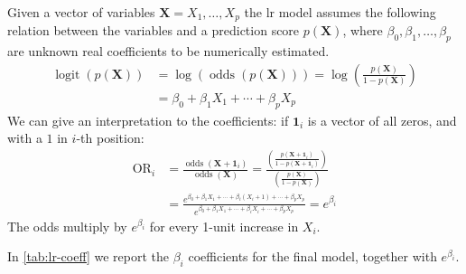 Given a vector of variables $\bm{X} = X_1, \dots, X_p$ the \gls{lr} model assumes the following relation between the variables and a prediction score $p(\bm{X})$, where $\beta_0, \beta_1, \dots, \beta_p$ are unknown real coefficients to be numerically estimated.
\begin{align*}
    \operatorname{logit}(p(\bm{X})) &= \log (\operatorname{odds}(p(\bm{X}))) = \log \left( \frac{p(\bm{X})}{1-p(\bm{X})} \right)\\
    & = \beta_0 + \beta_1 X_1 + \cdots + \beta_p X_p
\end{align*}
We can give an interpretation to the coefficients: if $\bm{1}_i$ is a vector of all zeros, and with a $1$ in $i$-th position:
\begin{align*}
\operatorname{OR}_i &= \frac{\operatorname{odds}(\bm{X}+\bm{1}_i)}{\operatorname{odds}(\bm{X})} = \frac{\left(\frac{p(\bm{X}+\bm{1}_i)}{1 - p(\bm{X}+\bm{1}_i)}\right)}{\left(\frac{p(\bm{X})}{1 - p(\bm{X})}\right)}\\
&= \frac{e^{\beta_0 + \beta_1 X_1 + \cdots + \beta_i (X_i + 1) + \cdots + \beta_p X_p}}{e^{\beta_0 + \beta_1 X_1 + \cdots + \beta_i X_i + \cdots + \beta_p X_p}} = e^{\beta_i}
\end{align*}
The odds multiply by $e^{\beta_i}$ for every 1-unit increase in $X_i$.
% 

In \autoref{tab:lr-coeff} we report the $\beta_i$ coefficients for the final model, together with $e^{\beta_i}$.

